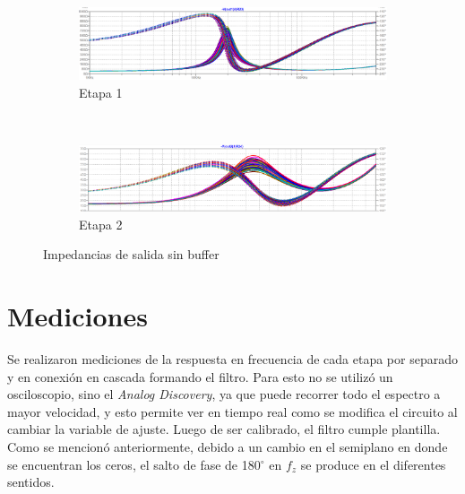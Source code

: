 \documentclass[../../tc_tp5_main.tex]{subfiles}
\begin{document}
\begin{figure}[H]	%
	\centering
	\begin{subfigure}[t]{\textwidth}
		\centering
		\includegraphics[width=\textwidth]{imagenes/zout_1.png}
		\caption{Etapa 1}
		\label{fig:ej3_zout_1}
	\end{subfigure}\\
	\begin{subfigure}[t]{\textwidth}
		\centering
		\includegraphics[width=\textwidth]{imagenes/zout_2.png}
		\caption{Etapa 2}
		\label{fig:ej3_zout_2}
	\end{subfigure}	
	\caption{Impedancias de salida sin buffer}
\end{figure}



\section{Mediciones}

Se realizaron mediciones de la respuesta en frecuencia de cada etapa por separado y en conexi\'on en cascada formando el filtro. Para esto no se utiliz\'o un osciloscopio, sino el \textit{Analog Discovery}, ya que puede recorrer todo el espectro a mayor velocidad, y esto permite ver en tiempo real como se modifica el circuito al cambiar la variable de ajuste. Luego de ser calibrado, el filtro cumple plantilla. Como se mencion\'o anteriormente, debido a un cambio en el semiplano en donde se encuentran los ceros, el salto de fase de 180$^\circ$ en $f_z$ se produce en el diferentes sentidos. 
\end{document}
